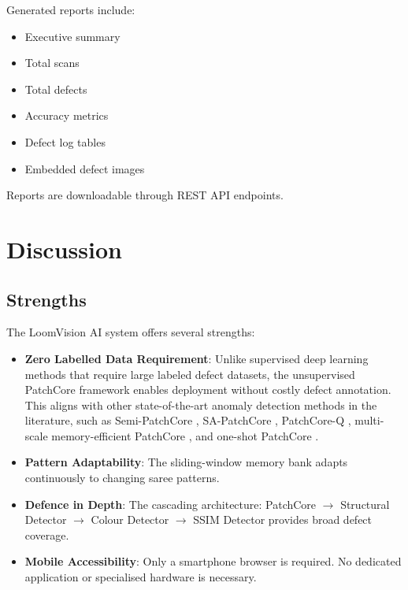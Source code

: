 \documentclass{ieeeaccess}
\begin{document}
Generated reports include:
\begin{itemize}
    \item Executive summary
    \item Total scans
    \item Total defects
    \item Accuracy metrics
    \item Defect log tables
    \item Embedded defect images
\end{itemize}
Reports are downloadable through REST API endpoints.

\section{Discussion}

\subsection{Strengths}
The LoomVision AI system offers several strengths:
\begin{itemize}
    \item \textbf{Zero Labelled Data Requirement}: Unlike supervised deep learning methods that require large labeled defect datasets, the unsupervised PatchCore framework enables deployment without costly defect annotation. This aligns with other state-of-the-art anomaly detection methods in the literature, such as Semi-PatchCore \cite{b13}, SA-PatchCore \cite{b14}, PatchCore-Q \cite{b15}, multi-scale memory-efficient PatchCore \cite{b16}, and one-shot PatchCore \cite{b17}.
    \item \textbf{Pattern Adaptability}: The sliding-window memory bank adapts continuously to changing saree patterns.
    \item \textbf{Defence in Depth}: The cascading architecture: PatchCore $\rightarrow$ Structural Detector $\rightarrow$ Colour Detector $\rightarrow$ SSIM Detector provides broad defect coverage.
    \item \textbf{Mobile Accessibility}: Only a smartphone browser is required. No dedicated application or specialised hardware is necessary.
\end{itemize}

\end{document}
